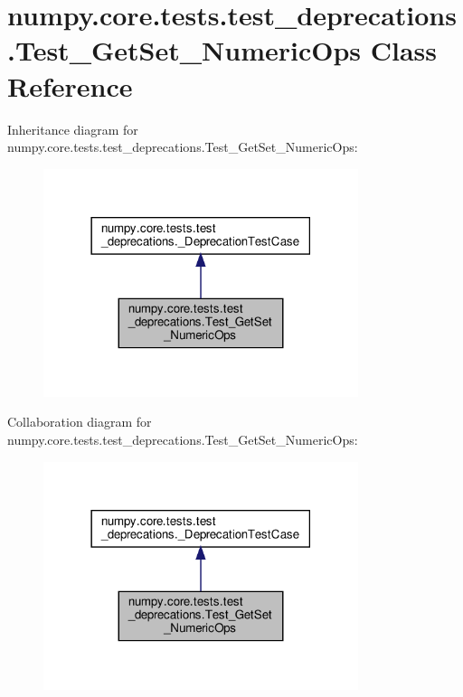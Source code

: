 \hypertarget{classnumpy_1_1core_1_1tests_1_1test__deprecations_1_1Test__GetSet__NumericOps}{}\section{numpy.\+core.\+tests.\+test\+\_\+deprecations.\+Test\+\_\+\+Get\+Set\+\_\+\+Numeric\+Ops Class Reference}
\label{classnumpy_1_1core_1_1tests_1_1test__deprecations_1_1Test__GetSet__NumericOps}


Inheritance diagram for numpy.\+core.\+tests.\+test\+\_\+deprecations.\+Test\+\_\+\+Get\+Set\+\_\+\+Numeric\+Ops\+:
\nopagebreak
\begin{figure}[H]
\begin{center}
\leavevmode
\includegraphics[width=261pt]{classnumpy_1_1core_1_1tests_1_1test__deprecations_1_1Test__GetSet__NumericOps__inherit__graph}
\end{center}
\end{figure}


Collaboration diagram for numpy.\+core.\+tests.\+test\+\_\+deprecations.\+Test\+\_\+\+Get\+Set\+\_\+\+Numeric\+Ops\+:
\nopagebreak
\begin{figure}[H]
\begin{center}
\leavevmode
\includegraphics[width=261pt]{classnumpy_1_1core_1_1tests_1_1test__deprecations_1_1Test__GetSet__NumericOps__coll__graph}
\end{center}
\end{figure}
